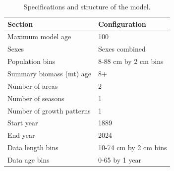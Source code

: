 \documentclass[
]{scrartcl}
\begin{document}
\begin{longtable}{ll}

\caption{\label{tbl-model-config}Specifications and structure of the
model.}

\tabularnewline

\toprule
Section & Configuration \\ 
\midrule\addlinespace[2.5pt]
Maximum model age & 100 \\ 
Sexes & Sexes combined \\ 
Population bins & 8-88 cm by 2 cm bins \\ 
Summary biomass (mt) age & 8+ \\ 
Number of areas & 2 \\ 
Number of seasons & 1 \\ 
Number of growth patterns & 1 \\ 
Start year & 1889 \\ 
End year & 2024 \\ 
Data length bins & 10-74 cm by 2 cm bins \\ 
Data age bins & 0-65 by 1 year \\ 
\bottomrule

\end{longtable}

\endgroup

\clearpage

\begingroup
\fontsize{9.0pt}{10.8pt}\selectfont
\end{document}
